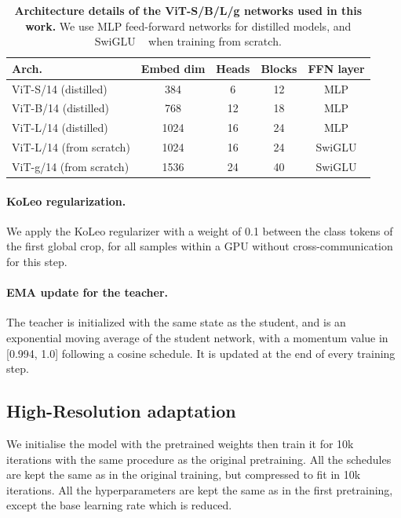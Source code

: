 \begin{table}[t]
\centering
\small
\begin{tabular}{@{}l cccc}
\toprule
Arch.     & Embed dim   & Heads & Blocks & FFN layer    \\
\midrule
ViT-S/14 (distilled)        & 384           & 6    & 12     & MLP        \\ 
ViT-B/14 (distilled)        & 768           & 12    & 18     & MLP        \\ 
ViT-L/14 (distilled)        & 1024          & 16    & 24     & MLP        \\ 
ViT-L/14 (from scratch)     & 1024          & 16    & 24     & SwiGLU   \\ 
ViT-g/14 (from scratch)     & 1536          & 24    & 40     & SwiGLU    \\
\bottomrule
\end{tabular}
\caption{
\textbf{Architecture details of the ViT-S/B/L/g networks used in this work.} We use MLP feed-forward networks for distilled models, and SwiGLU ~\citep{shazeer2020glu} when training from scratch.
}
\label{tab:vit-hparams}
\end{table}

\paragraph{KoLeo regularization.}
We apply the KoLeo regularizer with a weight of 0.1 between the class tokens of the first global crop, for all samples within a GPU without cross-communication for this step.

\paragraph{EMA update for the teacher.}
The teacher is initialized with the same state as the student, and is an exponential moving average of the student network, with a momentum value in [0.994, 1.0] following a cosine schedule. It is updated at the end of every training step.

\subsection{High-Resolution adaptation}
We initialise the model with the pretrained weights then train it for 10k iterations with the same procedure as the original pretraining. All the schedules are kept the same as in the original training, but compressed to fit in 10k iterations. All the hyperparameters are kept the same as in the first pretraining, except the base learning rate which is reduced.

